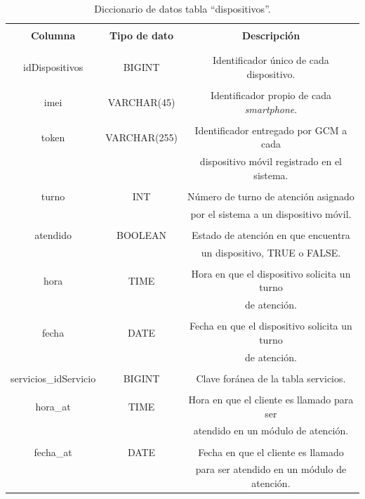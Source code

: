 \begin{spacing}{1.0}
	\begin{table}[H]
		\centering
		\caption{Diccionario de datos tabla ``dispositivos''.} 
		\begin{tabular}{|c|c|c|}
			\hline 
			\rowcolor{gray!30} &&\\
			\rowcolor{gray!30} \textbf{Columna} & \textbf{Tipo de dato} & \textbf{Descripción} \\ 
			\rowcolor{gray!30} &&\\
			\hline 
			&&\\[-0.2cm]
			idDispositivos & BIGINT & Identificador único de cada dispositivo. \\
			\hline 
			&&\\[-0.2cm]
			imei & VARCHAR(45) & Identificador propio de cada \textit{smartphone}. \\
			\hline 
			&&\\[-0.2cm]
			token & VARCHAR(255) & Identificador entregado por GCM a cada \\
			 & & dispositivo móvil registrado en el sistema. \\
			\hline 
			&&\\[-0.2cm]
			turno & INT & Número de turno de atención asignado \\
			 & & por el sistema a un dispositivo móvil. \\
			\hline 
			&&\\[-0.2cm]
			atendido & BOOLEAN & Estado de atención en que encuentra \\
			 & & un dispositivo, TRUE o FALSE. \\
			\hline 
			&&\\[-0.2cm]
			hora & TIME & Hora en que el dispositivo solicita un turno \\
			 & & de atención. \\
			\hline
			&&\\[-0.2cm]
			fecha & DATE & Fecha en que el dispositivo solicita un turno \\
			 & & de atención. \\
			\hline
			&&\\[-0.2cm]
			servicios\_idServicio & BIGINT & Clave foránea de la tabla servicios. \\
			\hline
			&&\\[-0.2cm]
			hora\_at & TIME & Hora en que el cliente es llamado para ser \\
			 & & atendido en un módulo de atención. \\
			\hline
			&&\\[-0.2cm]
			fecha\_at & DATE & Fecha en que el cliente es llamado \\
			 & & para ser atendido en un módulo de atención. \\
		    \hline
		\end{tabular}
		\label{diccionario_dispositivos}
	\end{table}
\end{spacing}


